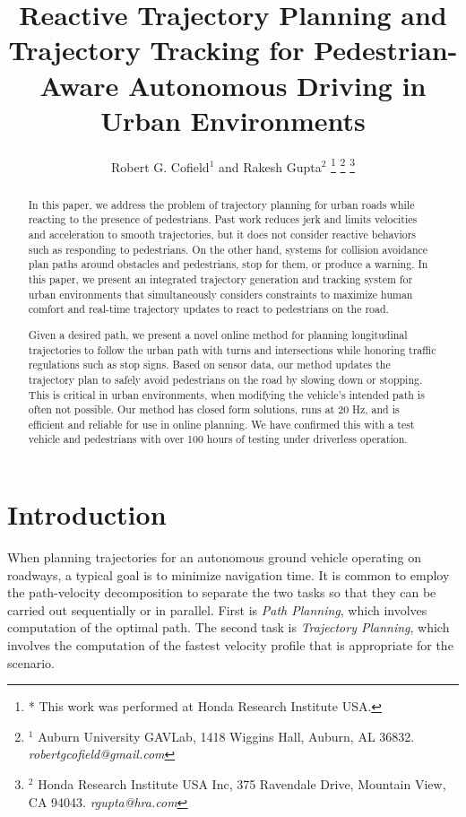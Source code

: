 \documentclass[letterpaper, 10 pt, conference]{ieeeconf}  %
\title{\LARGE \bf
  Reactive Trajectory Planning and Trajectory Tracking for Pedestrian-Aware Autonomous Driving in Urban Environments
}
\author{
  Robert G. Cofield$^{1}$ and
  Rakesh Gupta$^{2}$
  \thanks{
    * This work was performed at Honda Research Institute USA.
  }
  \thanks{
    $^{1}$ Auburn University GAVLab, 1418 Wiggins Hall, Auburn, AL 36832. \textit{robertgcofield@gmail.com}
  }
  \thanks{
    $^{2}$ Honda Research Institute USA Inc, 375 Ravendale Drive, Mountain View, CA 94043. \textit{rgupta@hra.com}
  }
}
\begin{document}
\maketitle
\thispagestyle{empty}
\pagestyle{empty}

\begin{abstract}
In this paper, we address the problem of trajectory planning for urban roads while reacting to the presence of pedestrians.
Past work reduces jerk and limits velocities and acceleration to smooth trajectories, but it does not consider reactive behaviors such as responding to pedestrians.
On the other hand, systems for collision avoidance plan paths around obstacles and pedestrians, stop for them, or produce a warning. 
In this paper, we present an integrated trajectory generation and tracking system for urban environments that simultaneously considers constraints to maximize human comfort and real-time trajectory updates to react to pedestrians on the road. 

Given a desired path, we present a novel online method for planning longitudinal trajectories to follow the urban path with turns and intersections while honoring traffic regulations such as stop signs.
Based on sensor data, our method updates the trajectory plan to safely avoid pedestrians on the road by slowing down or stopping.
This is critical in urban environments, when modifying the vehicle's intended path is often not possible.
Our method has closed form solutions, runs at 20 Hz, and is efficient and reliable for use in online planning.
We have confirmed this with a test vehicle and pedestrians with over 100 hours of testing under driverless operation.

\end{abstract}

\section{Introduction} \label{sec:introduction}

When planning trajectories for an autonomous ground vehicle operating on roadways, a typical goal is to minimize navigation time.
It is common to employ the path-velocity decomposition to separate the two tasks so that they can be carried out sequentially or in parallel.
First is {\it Path Planning}, which involves computation of the optimal path.
The second task is {\it Trajectory Planning}, which involves the computation of the fastest velocity profile that is appropriate for the scenario.
\end{document}
